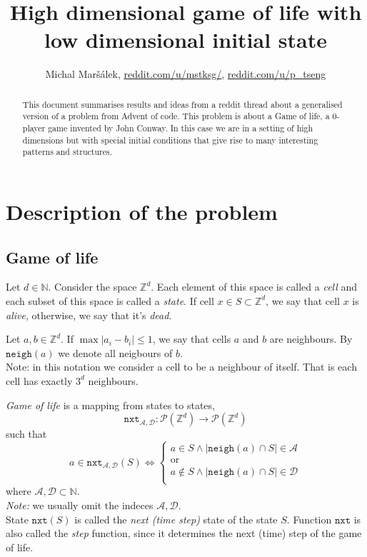 \documentclass[]{article}
\title{High dimensional game of life with low dimensional initial state}
\author{Michal Maršálek, \href{https://www.reddit.com/u/mstksg/}{reddit.com/u/mstksg/}, \href{https://www.reddit.com/u/p\_tseng/}{reddit.com/u/p\_tseng}}
\newcommand{\NN}{\mathbb N}
\newcommand{\ZZ}{\mathbb Z}
\newcommand{\calP}{\mathcal P}
\newcommand{\calA}{\mathcal A}
\newcommand{\calD}{\mathcal D}
\newcommand{\nxt}{\texttt{nxt}}
\newcommand{\neigh}{\texttt{neigh}}
\begin{document}
	
	\maketitle
	
	\begin{abstract}
		This document summarises results and ideas from a reddit thread about a generalised version of a problem from Advent of code. This problem is about a Game of life, a 0-player game invented by John Conway. In this case we are in a setting of high dimensions but with special initial conditions that give rise to many interesting patterns and structures.
	\end{abstract}
\newpage
	
	\section{Description of the problem}
	
	\subsection{Game of life}
	
	Let $d\in\NN$. Consider the space $\ZZ ^d$. Each element of this space is called a \emph{cell} and each subset of this space is called a \emph{state}. If cell $x \in S \subset \ZZ^d$, we say that cell $x$ is \emph{alive}, otherwise, we say that it's \emph{dead}.
	
	Let $a,b \in \ZZ^d$. If $\max |a_i - b_i| \leq 1$, we say that cells $a$ and $b$ are neighbours. By $\neigh(a)$ we denote all neigbours of $b$.\\
	Note: in this notation we consider a cell to be a neighbour of itself. That is each cell has exactly $3^d$ neighbours.
	
	\emph{Game of life} is a mapping from states to states,
	$$\nxt_{\calA, \calD}: \calP(\ZZ^d) \to \calP(\ZZ^d)$$
	such that
	$$a \in \nxt_{\calA, \calD}(S) \iff \begin{cases}
	a \in S \land |\neigh(a) \cap S| \in \calA\\
	\text{or}\\
	a \not\in S \land |\neigh(a) \cap S| \in \calD\\
	\end{cases}
	$$
	where $\calA, \calD \subset \NN$.\\
	\emph{Note:} we usually omit the indeces $\calA, \calD$.\\
	State $\nxt(S)$ is called the \emph{next (time step)} state of the state $S$. Function $\nxt$ is also called the \emph{step} function, since it determines the next (time) step of the game of life.
	
\end{document}

